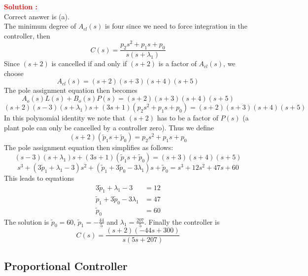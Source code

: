 \documentclass[12pt]{article}
\begin{document}
\textbf{\textcolor{red}{Solution :}} \\ 
Correct answer is (a).\\
The minimum degree of $A_{cl}(s)$ is four since we need to force integration in the controller, then
\begin{equation}
C(s) = \frac{p_2s^2 + p_1s + p_0}{s(s + \lambda_1)}
\end{equation}
Since $(s + 2)$ is cancelled if and only if $(s + 2)$ is a factor of $A_{cl}(s)$, we choose
\begin{equation}
A_{cl}(s) = (s + 2)(s + 3)(s + 4)(s + 5)
\end{equation}
The pole assignment equation then becomes
\begin{equation}
A_o(s)L(s) + B_o(s)P(s) = (s + 2)(s + 3)(s + 4)(s + 5)
\end{equation}
\begin{equation}
(s + 2)(s - 3)(s + \lambda_1)s + (3s + 1)(p_2s^2 + p_1s + p_0) = (s + 2)(s + 3)(s + 4)(s + 5)
\end{equation}
In this polynomial identity we note that $(s + 2)$ has to be a factor of $P(s)$ (a plant pole can only be cancelled by a controller zero). Thus we define
\begin{equation}
(s + 2)(\tilde{p}_1s + \tilde{p}_0) = p_2s^2 + p_1s + p_0
\end{equation}
The pole assignment equation then simplifies as follows:
\begin{equation}
(s - 3)(s + \lambda_1)s + (3s + 1)(\tilde{p}_1s + \tilde{p}_0) = (s + 3)(s + 4)(s + 5)
\end{equation}
\begin{equation}
s^3 + (3\tilde{p}_1 + \lambda_1 - 3)s^2 + (\tilde{p}_1 + 3\tilde{p}_0 - 3\lambda_1)s + \tilde{p}_0 = s^3 + 12s^2 + 47s + 60
\end{equation}
This leads to equations
\begin{align}
3\tilde{p}_1 + \lambda_1 - 3 &= 12 \\
\tilde{p}_1 + 3\tilde{p}_0 - 3\lambda_1 &= 47 \\
\tilde{p}_0 &= 60
\end{align}
The solution is $\tilde{p}_0 = 60$, $\tilde{p}_1 = -\frac{44}{5}$ and $\lambda_1 = \frac{207}{5}$. Finally the controller is
\begin{equation}
C(s) = \frac{(s + 2)(-44s + 300)}{s(5s + 207)}
\end{equation}
\clearpage
\subsection{Proportional Controller}
\end{document}
